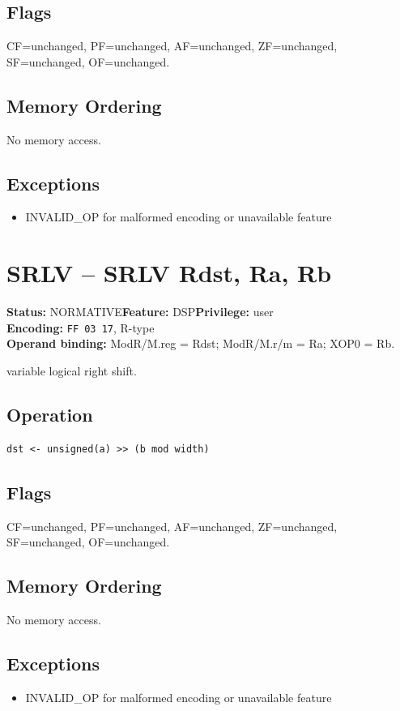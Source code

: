 \documentclass[10pt]{article}
\begin{document}
\subsection*{Flags}
CF=unchanged, PF=unchanged, AF=unchanged, ZF=unchanged, SF=unchanged, OF=unchanged.
\subsection*{Memory Ordering}
No memory access.
\subsection*{Exceptions}
\begin{itemize}
\item INVALID\_OP for malformed encoding or unavailable feature
\end{itemize}
\clearpage

\section{SRLV -- SRLV Rdst, Ra, Rb}
\textbf{Status:} NORMATIVE\quad \textbf{Feature:} DSP\quad \textbf{Privilege:} user\\
\textbf{Encoding:} \texttt{FF 03 17}, R-type\\
\textbf{Operand binding:} ModR/M.reg = Rdst; ModR/M.r/m = Ra; XOP0 = Rb.

variable logical right shift.

\subsection*{Operation}
\begin{lstlisting}
dst <- unsigned(a) >> (b mod width)
\end{lstlisting}
\subsection*{Flags}
CF=unchanged, PF=unchanged, AF=unchanged, ZF=unchanged, SF=unchanged, OF=unchanged.
\subsection*{Memory Ordering}
No memory access.
\subsection*{Exceptions}
\begin{itemize}
\item INVALID\_OP for malformed encoding or unavailable feature
\end{itemize}
\clearpage
\end{document}

